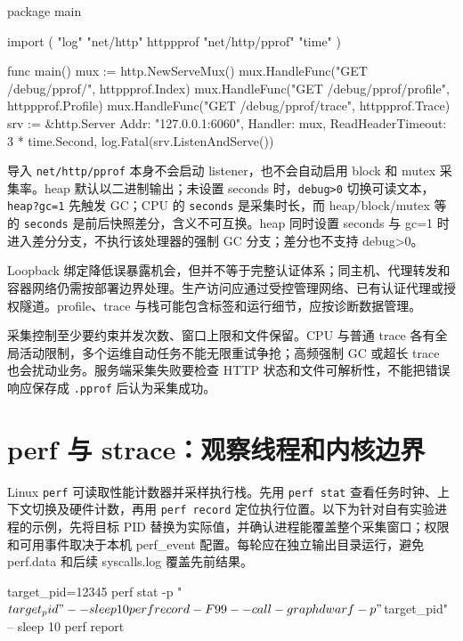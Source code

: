 \documentclass[UTF8,fontset=fandol,openany,11pt]{ctexbook}
\begin{document}
\begin{codeblock}
package main

import (
	"log"
	"net/http"
	httppprof "net/http/pprof"
	"time"
)

func main() {
	mux := http.NewServeMux()
	mux.HandleFunc("GET /debug/pprof/", httppprof.Index)
	mux.HandleFunc("GET /debug/pprof/profile", httppprof.Profile)
	mux.HandleFunc("GET /debug/pprof/trace", httppprof.Trace)
	srv := &http.Server{
		Addr:              "127.0.0.1:6060",
		Handler:           mux,
		ReadHeaderTimeout: 3 * time.Second,
	}
	log.Fatal(srv.ListenAndServe())
}
\end{codeblock}

导入 \texttt{net/\allowbreak{}http/\allowbreak{}pprof} 本身不会启动 listener，也不会自动启用 block 和 mutex 采集率。heap 默认以二进制输出；未设置 seconds 时，\texttt{debug>0} 切换可读文本，\texttt{heap?gc=1} 先触发 GC；CPU 的 \texttt{seconds} 是采集时长，而 heap/block/mutex 等的 \texttt{seconds} 是前后快照差分，含义不可互换。heap 同时设置 seconds 与 gc=1 时进入差分分支，不执行该处理器的强制 GC 分支；差分也不支持 debug>0。\cite{tools-http-pprof}

Loopback 绑定降低误暴露机会，但并不等于完整认证体系；同主机、代理转发和容器网络仍需按部署边界处理。生产访问应通过受控管理网络、已有认证代理或授权隧道。profile、trace 与栈可能包含标签和运行细节，应按诊断数据管理。

采集控制至少要约束并发次数、窗口上限和文件保留。CPU 与普通 trace 各有全局活动限制，多个运维自动任务不能无限重试争抢；高频强制 GC 或超长 trace 也会扰动业务。服务端采集失败要检查 HTTP 状态和文件可解析性，不能把错误响应保存成 \texttt{.\allowbreak{}pprof} 后认为采集成功。

\section{perf 与 strace：观察线程和内核边界}
Linux \texttt{perf} 可读取性能计数器并采样执行栈。先用 \texttt{perf stat} 查看任务时钟、上下文切换及硬件计数，再用 \texttt{perf record} 定位执行位置。以下为针对自有实验进程的示例，先将目标 PID 替换为实际值，并确认进程能覆盖整个采集窗口；权限和可用事件取决于本机 perf\_event 配置。每轮应在独立输出目录运行，避免 perf.data 和后续 syscalls.log 覆盖先前结果。

\begin{codeblock}
target_pid=12345
perf stat -p "$target_pid" -- sleep 10
perf record -F 99 --call-graph dwarf -p "$target_pid" -- sleep 10
perf report
\end{codeblock}
\end{document}
